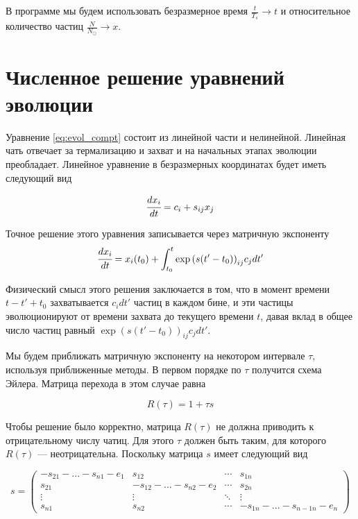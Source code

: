 В программе мы будем использовать безразмерное время $\frac{t}{T_s} \rightarrow t$ и относительное количество частиц $\frac{N}{N_{\odot}}\rightarrow x$. 


\section{Численное решение уравнений эволюции}

Уравнение \ref{eq:evol_compt} состоит из линейной части и нелинейной. Линейная чать отвечает за термализацию и захват и на начальных этапах эволюции преобладает. Линейное уравнение в безразмерных координатах будет иметь следующий вид

\begin{equation}
	\label{eq:evol_x}
	\cfrac{d x_i}{d t}  = c_{i} + s_{ij} x_j
\end{equation}

Точное решение этого уравнения записывается через матричную экспоненту 
\begin{equation}
	\label{eq:evol_solve}
	\cfrac{d x_i}{d t}  = x_i(t_0) + \int_{t_0}^{t}{\exp{(s (t'-t_0))}_{ij}c_{j}dt'}
\end{equation}

Физический смысл этого решения заключается в том, что в момент времени $t-t'+t_0$ захватывается $c_i dt'$ частиц в каждом бине, и эти частицы эволюционируют от времени захвата до текущего времени $t$, давая вклад в общее число частиц равный $\exp{(s (t'-t_0))}_{ij}c_{j}dt'$. 

Мы будем приближать матричную экспоненту на некотором интервале $\tau$, используя приближенные методы. 
В первом порядке по $\tau$ получится схема Эйлера. Матрица перехода в этом случае равна

\begin{equation}
	\label{eq:R_tau_euler}
	R(\tau) = 1 + \tau s
\end{equation}

Чтобы решение было корректно, матрица $R(\tau)$ не должна приводить к отрицательному числу чатиц. Для этого $\tau$ должен быть таким, для которого $R(\tau)$ --- неотрицательна. Поскольку матрица $s$ имеет следующий вид 

\begin{equation*}
	\label{s_matrix_view}
	s = \begin{pmatrix}
		-s_{21}-...-s_{n1}-e_1 & s_{12} & \cdots & s_{1n} \\
		s_{21} & -s_{12}-... - s_{n2}-e_2 & \cdots & s_{2n} \\
		\vdots & \vdots & \ddots & \vdots \\
		s_{n1} & s_{n2} & \cdots & -s_{1n}-... - s_{n-1n}-e_n
	\end{pmatrix}
\end{equation*}

